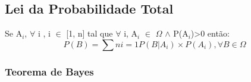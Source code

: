 \documentclass[a4paper,12pt]{article}
\begin{document}
			\subsection{Lei da Probabilidade Total}
				Se A$_i$, $\forall$ i , i $\in$ [1, n] tal que $\forall$ i, A$_i$ $\in$ $\Omega$ $\land$ P(A$_i$)>0 então:
				\begin{equation}
                                          P(B)=\sum{n}{i=1}P(B|A_i)\times P(A_i), \forall B \in \Omega
                                  \end{equation}


				\subsubsection{Teorema de Bayes}

			
\end{document}
